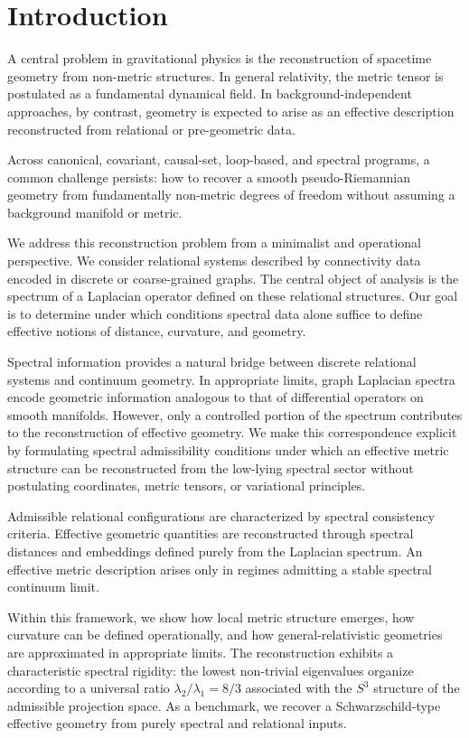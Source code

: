 \section{Introduction}
  \label{sec:introduction}

  A central problem in gravitational physics is the reconstruction of spacetime
  geometry from non-metric structures.
  In general relativity, the metric tensor is postulated as a fundamental dynamical
  field.
  In background-independent approaches, by contrast, geometry is expected to arise
  as an effective description reconstructed from relational or pre-geometric data.

  Across canonical, covariant, causal-set, loop-based, and spectral programs,
  a common challenge persists: how to recover a smooth pseudo-Riemannian geometry
  from fundamentally non-metric degrees of freedom without assuming a background
  manifold or metric.

  We address this reconstruction problem from a minimalist and operational
  perspective.
  We consider relational systems described by connectivity data encoded in
  discrete or coarse-grained graphs.
  The central object of analysis is the spectrum of a Laplacian operator defined
  on these relational structures.
  Our goal is to determine under which conditions spectral data alone suffice
  to define effective notions of distance, curvature, and geometry.

  Spectral information provides a natural bridge between discrete relational
  systems and continuum geometry.
  In appropriate limits, graph Laplacian spectra encode geometric information
  analogous to that of differential operators on smooth manifolds.
  However, only a controlled portion of the spectrum contributes to the
  reconstruction of effective geometry.
  We make this correspondence explicit by formulating spectral admissibility
  conditions under which an effective metric structure can be reconstructed
  from the low-lying spectral sector without postulating coordinates,
  metric tensors, or variational principles.

  Admissible relational configurations are characterized by spectral consistency
  criteria.
  Effective geometric quantities are reconstructed through spectral distances
  and embeddings defined purely from the Laplacian spectrum.
  An effective metric description arises only in regimes admitting a stable
  spectral continuum limit.

  Within this framework, we show how local metric structure emerges,
  how curvature can be defined operationally,
  and how general-relativistic geometries are approximated in appropriate limits.
  The reconstruction exhibits a characteristic spectral rigidity:
  the lowest non-trivial eigenvalues organize according to a universal
  ratio $\lambda_2/\lambda_1 = 8/3$ associated with the $S^3$ structure
  of the admissible projection space.
  As a benchmark, we recover a Schwarzschild-type effective geometry from
  purely spectral and relational inputs.

